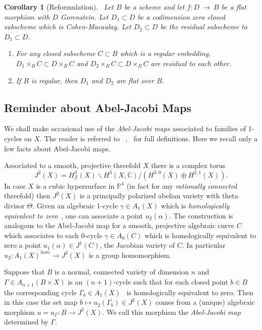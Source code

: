 \documentclass[twoside,12pt,reqno]{amsart}
\theoremstyle{plain}
\newtheorem{cor}[thm]{Corollary}
\theoremstyle{definition}
\newcommand{\ZZ}{\mathbb{Z}}
\newcommand{\CC}{\mathbb{C}}
\newcommand{\PP}{\mathbb{P}}
\def\ps{\vspace{4pt}}
\newcommand{\lt}{\left}
\newcommand{\rt}{\right}
\begin{document}
\ps

\begin{cor}[Reformulation]~\label{cor-reform}  Let $B$ be a scheme and let 
$f:D~\rightarrow~ B$ be a flat morphism with $D$ Gorenstein.  Let
$D_1\subset D$ be a codimension zero closed subscheme which is
Cohen-Macaulay.  Let $D_2\subset D$ be the residual
subscheme to $D_1\subset D$.  
\begin{enumerate}
\item For any closed subscheme $C\subset B$ which is a regular
embedding, $D_1\times_B C\subset D\times_B C$ and $D_2\times_B
C\subset D\times_B C$ are residual to each other.
\item If $B$ is regular, then $D_1$ and $D_2$ are flat over $B$.
\end{enumerate}
\end{cor}

\subsection{Reminder about Abel-Jacobi Maps}

We shall make occasional use of the \emph{Abel-Jacobi maps} associated 
to families of 1-cycles on $X$.  The reader is referred to
~\cite{CG},~\cite{VHS} for full definitions.  Here we recall only a
few facts 
about Abel-Jacobi maps.

\ps

Associated to a smooth, projective threefold $X$ there is a complex
torus  
\begin{equation}
J^2(X) = H^3_\ZZ(X)\backslash H^3(X,\CC) / \lt(H^{3,0}(X)\oplus
H^{2,1}(X)\rt).
\end{equation}
In case $X$ is a cubic hypersurface in $\PP^4$ (in fact for any
\emph{rationally connected} threefold) then $J^2(X)$ is a principally
polarized
abelian variety with theta divisor $\Theta$.  Given an algebraic
1-cycle $\gamma\in A_1(X)$ which 
is \emph{homologically equivalent to zero}~\cite[13]{VHS}, one can
associate a point $u_2(\alpha)$.  The construction is analogous to
the Abel-Jacobi map for a smooth, projective algebraic curve $C$ which 
associates to each 0-cycle $\gamma\in A_0(C)$ which is homologically
equivalent to zero a point $u_1(\alpha)\in J^1(C)$, the Jacobian
variety of $C$.  In particular $u_2:A_1(X)^{hom}\rightarrow J^2(X)$ is 
a group homomorphism.

\ps

Suppose that $B$ is a normal, connected variety of dimension $n$ and
$\Gamma\in A_{n+1}(B\times X)$ is an $(n+1)$-cycle such that for each
closed point $b\in B$ the corresponding cycle $\Gamma_b\in
A_1(X)$~\cite[\S 10.1]{F} is homologically equivalent to zero.  Then
in this case the set map $b\mapsto u_2(\Gamma_b)\in J^2(X)$ comes from 
a (unique) algebraic morphism $u=u_\Gamma:B\rightarrow J^2(X)$.  We
call this morphism the \emph{Abel-Jacobi map} determined by $\Gamma$.
\end{document}
